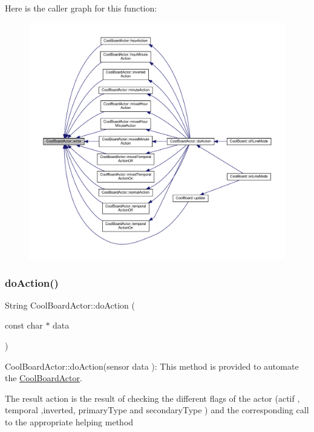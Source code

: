 Here is the caller graph for this function\+:\nopagebreak
\begin{figure}[H]
\begin{center}
\leavevmode
\includegraphics[width=350pt]{dc/d69/class_cool_board_actor_a958786ff01ea1056ee72c72d439f86da_icgraph}
\end{center}
\end{figure}
\mbox{\label{class_cool_board_actor_a3323ba7aaa4bef3ff084dcd830fe9b61}} 
\subsubsection{\texorpdfstring{do\+Action()}{doAction()}}
{\footnotesize\ttfamily String Cool\+Board\+Actor\+::do\+Action (\begin{DoxyParamCaption}\item[{const char $\ast$}]{data }\end{DoxyParamCaption})}

Cool\+Board\+Actor\+::do\+Action(sensor data )\+: This method is provided to automate the \hyperlink{class_cool_board_actor}{Cool\+Board\+Actor}.

The result action is the result of checking the different flags of the actor (actif , temporal ,inverted, primary\+Type and secondary\+Type ) and the corresponding call to the appropriate helping method

